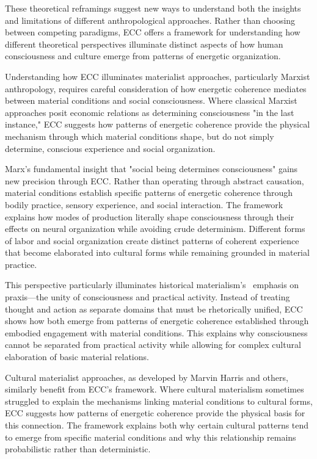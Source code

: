 These theoretical reframings suggest new ways to understand both the insights and limitations of different anthropological approaches. Rather than choosing between competing paradigms, ECC offers a framework for understanding how different theoretical perspectives illuminate distinct aspects of how human consciousness and culture emerge from patterns of energetic organization.

Understanding how ECC illuminates materialist approaches, particularly Marxist anthropology, requires careful consideration of how energetic coherence mediates between material conditions and social consciousness. Where classical Marxist approaches posit economic relations as determining consciousness "in the last instance," ECC suggests how patterns of energetic coherence provide the physical mechanism through which material conditions shape, but do not simply determine, conscious experience and social organization.

Marx's fundamental insight that "social being determines consciousness" gains new precision through ECC. Rather than operating through abstract causation, material conditions establish specific patterns of energetic coherence through bodily practice, sensory experience, and social interaction. The framework explains how modes of production literally shape consciousness through their effects on neural organization while avoiding crude determinism. Different forms of labor and social organization create distinct patterns of coherent experience that become elaborated into cultural forms while remaining grounded in material practice.

This perspective particularly illuminates historical materialism's~ emphasis on praxis---the unity of consciousness and practical activity. Instead of treating thought and action as separate domains that must be rhetorically unified, ECC shows how both emerge from patterns of energetic coherence established through embodied engagement with material conditions. This explains why consciousness cannot be separated from practical activity while allowing for complex cultural elaboration of basic material relations.

Cultural materialist approaches, as developed by Marvin Harris and others, similarly benefit from ECC's framework. Where cultural materialism sometimes struggled to explain the mechanisms linking material conditions to cultural forms, ECC suggests how patterns of energetic coherence provide the physical basis for this connection. The framework explains both why certain cultural patterns tend to emerge from specific material conditions and why this relationship remains probabilistic rather than deterministic.

